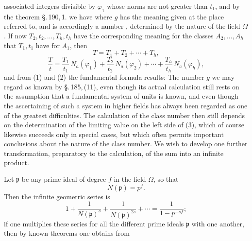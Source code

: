 associated integers divisible by $\varphi_1$ whose norms are not greater than $t_1$, and by the theorem \S.\,190,\,1. we have
where $g$ has the meaning given at the place referred to, and is accordingly a number , determined by the nature of the field $\Omega$. If now $T_2, t_2, \ldots, T_h, t_h$ have the corresponding meaning for the classes $A_2, \ldots, A_h$ that $T_1, t_1$ have for $A_1$, then
\[
T = T_1 + T_2 + \cdots + T_h,
\]
\[
\frac{T}{t} = \frac{T_1}{t_1}\, N_a(\varphi_1) + \frac{T_2}{t_2}\, N_a(\varphi_2) + \cdots + \frac{T_h}{t_h}\, N_a(\varphi_h),
\]
and from (1) and (2) the fundamental formula results:
The number $g$ we may regard as known by \S.\,185,\,(11), even though its actual calculation still rests on the assumption that a fundamental system of units is known, and even though the ascertaining of such a system in higher fields has always been regarded as one of the greatest difficulties. The calculation of the class number then still depends on the determination of the limiting value on the left side of (3), which of course likewise succeeds only in special cases, but which often permits important conclusions about the nature of the class number. We wish to develop one further transformation, preparatory to the calculation, of the sum
into an infinite product.

Let $\mathfrak{p}$ be any prime ideal of degree $f$ in the field $\Omega$, so that
\[
N(\mathfrak{p}) = p^f.
\]
Then the infinite geometric series is
\[
1 + \frac{1}{N(\mathfrak{p})^s} + \frac{1}{N(\mathfrak{p})^{2s}} + \cdots = \frac{1}{1-p^{-sf}};
\]
if one multiplies these series for all the different prime ideals $\mathfrak{p}$ with one another, then by known theorems one obtains from
